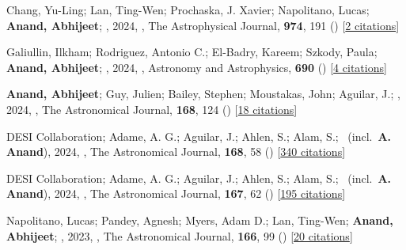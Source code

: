 \item[{\color{numcolor}\scriptsize10}] Chang, Yu-Ling; Lan, Ting-Wen; Prochaska, J. Xavier; Napolitano, Lucas; \textbf{Anand, Abhijeet}; \etal, 2024, , The Astrophysical Journal, \textbf{974}, 191 () [\href{https://ui.adsabs.harvard.edu/abs/2024ApJ...974..191C}{2 citations}]

\item[{\color{numcolor}\scriptsize9}] Galiullin, Ilkham; Rodriguez, Antonio C.; El-Badry, Kareem; Szkody, Paula; \textbf{Anand, Abhijeet}; \etal, 2024, , Astronomy and Astrophysics, \textbf{690} () [\href{https://ui.adsabs.harvard.edu/abs/2024A&A...690A.374G}{4 citations}]

\item[{\color{numcolor}\scriptsize8}] \textbf{Anand, Abhijeet}; Guy, Julien; Bailey, Stephen; Moustakas, John; Aguilar, J.; \etal, 2024, , The Astronomical Journal, \textbf{168}, 124 () [\href{https://ui.adsabs.harvard.edu/abs/2024AJ....168..124A}{18 citations}]

\item[{\color{numcolor}\scriptsize7}] DESI Collaboration; Adame, A. G.; Aguilar, J.; Ahlen, S.; Alam, S.; \etal\ (incl.\ \textbf{A. Anand}), 2024, , The Astronomical Journal, \textbf{168}, 58 () [\href{https://ui.adsabs.harvard.edu/abs/2024AJ....168...58D}{340 citations}]

\item[{\color{numcolor}\scriptsize6}] DESI Collaboration; Adame, A. G.; Aguilar, J.; Ahlen, S.; Alam, S.; \etal\ (incl.\ \textbf{A. Anand}), 2024, , The Astronomical Journal, \textbf{167}, 62 () [\href{https://ui.adsabs.harvard.edu/abs/2024AJ....167...62D}{195 citations}]

\item[{\color{numcolor}\scriptsize5}] Napolitano, Lucas; Pandey, Agnesh; Myers, Adam D.; Lan, Ting-Wen; \textbf{Anand, Abhijeet}; \etal, 2023, , The Astronomical Journal, \textbf{166}, 99 () [\href{https://ui.adsabs.harvard.edu/abs/2023AJ....166...99N}{20 citations}]

